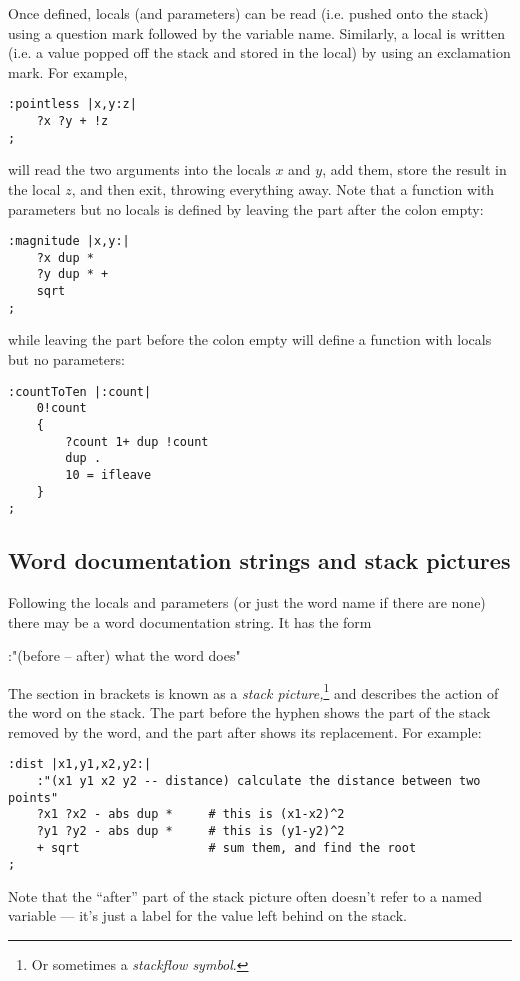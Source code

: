 Once defined, locals (and parameters) can be read (i.e. pushed onto
the stack) using a question mark followed by the variable name.
Similarly, a local is written (i.e. a value popped off the stack and
stored in the local) by using an exclamation mark. For example,
\begin{lstlisting}
:pointless |x,y:z|
    ?x ?y + !z
;
\end{lstlisting}
will read the two arguments into the locals $x$ and $y$, add them,
store the result in the local $z$, and then exit, throwing everything away.
Note that a function with parameters but no locals is defined by leaving
the part after the colon empty:
\begin{lstlisting}
:magnitude |x,y:|
    ?x dup *
    ?y dup * +
    sqrt
;
\end{lstlisting}
while leaving the part before the colon empty will define a function with
locals but no parameters:
\begin{lstlisting}
:countToTen |:count|
    0!count
    {
        ?count 1+ dup !count
        dup .
        10 = ifleave
    }
;
\end{lstlisting}

     
\subsection{Word documentation strings and stack pictures}
\label{stackpic}
Following the locals and parameters (or just the word name if there
are none) there may be a word documentation string. It has the form
\begin{v}
:"(before -- after) what the word does"
\end{v}
The section in brackets is known as a \emph{stack picture,}\footnote{Or sometimes
a \emph{stackflow symbol}.} and describes
the action of the word on the stack. The part before the hyphen
shows the part of the stack removed by the word, and the part after
shows its replacement. For example:
\begin{lstlisting}
:dist |x1,y1,x2,y2:|
    :"(x1 y1 x2 y2 -- distance) calculate the distance between two points"
    ?x1 ?x2 - abs dup *     # this is (x1-x2)^2
    ?y1 ?y2 - abs dup *     # this is (y1-y2)^2
    + sqrt                  # sum them, and find the root
;
\end{lstlisting}
Note that the ``after'' part of the stack picture often doesn't refer to a named variable ---
it's just a label for the value left behind on the stack.

